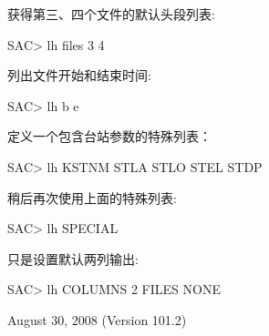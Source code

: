 获得第三、四个文件的默认头段列表:
\begin{SACCode}
SAC> lh files 3 4
\end{SACCode}

列出文件开始和结束时间:
\begin{SACCode}
SAC> lh b e
\end{SACCode}

定义一个包含台站参数的特殊列表：
\begin{SACCode}
SAC> lh KSTNM STLA STLO STEL STDP
\end{SACCode}

稍后再次使用上面的特殊列表:
\begin{SACCode}
SAC> lh SPECIAL
\end{SACCode}

只是设置默认两列输出:
\begin{SACCode}
SAC> lh COLUMNS 2 FILES NONE
\end{SACCode}

August 30, 2008 (Version 101.2)
